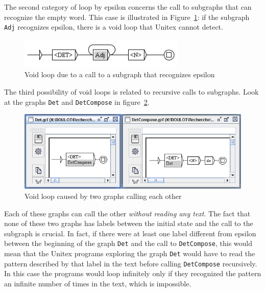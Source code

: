 \noindent The second category of loop by epsilon concerns the call to subgraphs
that can recognize the empty word. This case is illustrated in
Figure~\ref{fig-epsilon-subgraph-loop}: if the subgraph
\verb+Adj+ recognizes epsilon, there is a void loop that Unitex cannot detect.

\begin{figure}[!ht]
\begin{center}
\includegraphics[width=7.9cm]{resources/img/fig6-9.png}
\caption{Void loop due to a call to a subgraph that recognizes epsilon
\label{fig-epsilon-subgraph-loop}}
\end{center}
\end{figure}

\noindent The third possibility of void loops is related to recursive calls to
subgraphs. Look at the graphs \verb+Det+ and \verb+DetCompose+ in
figure~\ref{fig-recursive-calls-loop}.

\begin{figure}[!ht]
\begin{center}
\includegraphics[width=15.5cm]{resources/img/fig6-10.png}
\caption{Void loop caused by two graphs calling each
other\label{fig-recursive-calls-loop}}
\end{center}
\end{figure}

\noindent Each of these graphs can call
the other \textit{without reading any text}. The fact that none of these two
graphs has labels between the initial state and the call to the subgraph is
crucial. In fact, if there were at least one label different from epsilon between
the beginning of the graph \verb+Det+ and the call to \verb+DetCompose+, this
would mean that the Unitex programs exploring the graph \verb+Det+ would have to
read the pattern described by that label in the text before calling
\verb+DetCompose+ recursively. In this case the programs would loop infinitely
only if they  recognized the pattern an infinite number of times in the text,
which is impossible.

